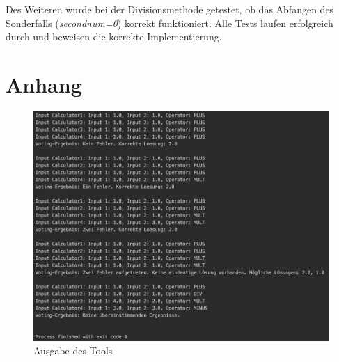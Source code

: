 Des Weiteren wurde bei der Divisionsmethode getestet, ob das Abfangen des Sonderfalls (\textit{second\textunderscore num=0}) korrekt funktioniert. Alle Tests laufen erfolgreich durch und beweisen die korrekte Implementierung.

\chapter{Anhang}
\begin{figure}[H]
\centering
\includegraphics[width=1\textwidth]{images/tool_output.png}
\caption{Ausgabe des Tools}
\label{fig:output}
\end{figure}
